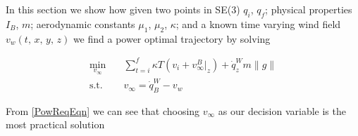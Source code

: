 
In this section we show how given two points in SE(3) $q_i$, $q_f$; physical properties $I_B$, $m$; aerodynamic constants $\mu_1$, $\mu_2$, $\kappa$; and a known time varying wind field $v_w\left(t\text{, }x\text{, }y\text{, }z\right)$ we find a power optimal trajectory by solving

\begin{equation}
\begin{aligned}
	\min_{v_\infty} \quad & \sum\limits_{t=i}^{f}\kappa T \left(v_i + v_\infty^B|_z \right) + \dot{q}^W_z m \|g\| \\
	\textrm{s.t.} \quad & v_\infty = \dot{q}^W_B - v_w
\end{aligned}
\end{equation}

From \eqref{PowReqEqn} we can see that choosing $v_\infty$ as our decision variable is the most practical solution 
